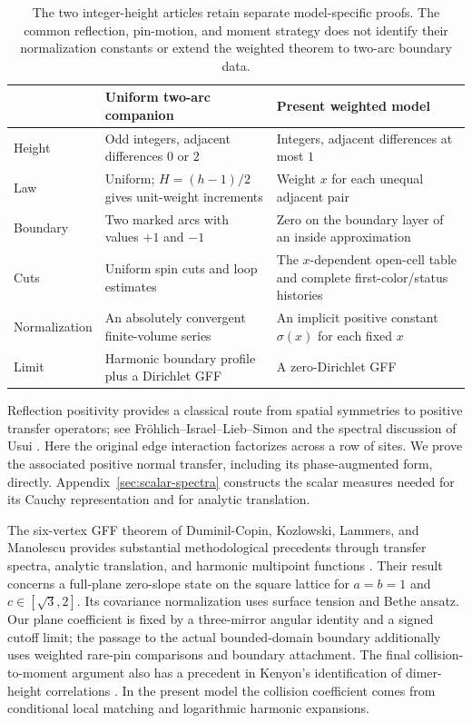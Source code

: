 \begin{table}[!htbp]
\centering
\small
\renewcommand{\arraystretch}{1.22}
\begin{tabular}{p{}p{}p{}}
\hline
 & Uniform two-arc companion & Present weighted model \\
\hline
Height & Odd integers, adjacent differences $0$ or $2$ &
Integers, adjacent differences at most $1$ \\
Law & Uniform; $H=(h-1)/2$ gives unit-weight increments &
Weight $x$ for each unequal adjacent pair \\
Boundary & Two marked arcs with values $+1$ and $-1$ &
Zero on the boundary layer of an inside approximation \\
Cuts & Uniform spin cuts and loop estimates &
The $x$-dependent open-cell table and complete first-color/status histories \\
Normalization & An absolutely convergent finite-volume series &
An implicit positive constant $\sigma(x)$ for each fixed $x$ \\
Limit & Harmonic boundary profile plus a Dirichlet GFF &
A zero-Dirichlet GFF \\
\hline
\end{tabular}
\caption{The two integer-height articles retain separate model-specific
proofs.  The common reflection, pin-motion, and moment strategy does not
identify their normalization constants or extend the weighted theorem
to two-arc boundary data.}
\label{tab:integer-models}
\end{table}
\FloatBarrier

Reflection positivity provides a classical route from spatial symmetries
to positive transfer operators; see Fr\"ohlich--Israel--Lieb--Simon
\cite{FILS1978} and the spectral discussion of Usui
\cite[Sections~3--4]{Usui2012}.  Here the original edge interaction
factorizes across a row of sites.  We prove the associated positive
normal transfer, including its phase-augmented form, directly.
Appendix~\ref{sec:scalar-spectra} constructs the scalar measures needed
for its Cauchy representation and for analytic translation.

The six-vertex GFF theorem of Duminil-Copin, Kozlowski, Lammers, and
Manolescu provides substantial methodological precedents through transfer
spectra, analytic translation, and harmonic multipoint functions
\cite[Section~4.5; Lemma~7.4; Section~7.2]{DCKLM2026}.  Their result concerns a
full-plane zero-slope state on the square lattice for
$a=b=1$ and $c\in[\sqrt3,2]$.  Its covariance normalization uses
surface tension and Bethe ansatz.  Our plane coefficient is fixed by a
three-mirror angular identity and a signed cutoff limit; the passage to
the actual bounded-domain boundary additionally uses weighted rare-pin
comparisons and boundary attachment.  The final collision-to-moment
argument also has a precedent in Kenyon's identification of dimer-height
correlations \cite[Lemma~3.1 and Proposition~3.2]{Kenyon2001}.  In the present model the
collision coefficient comes from conditional local matching and
logarithmic harmonic expansions.

